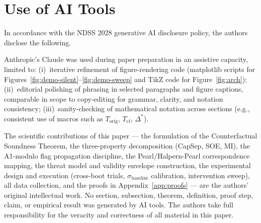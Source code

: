 \documentclass[conference]{IEEEtran}
\newcommand{\Korig}{T_\text{orig}}
\newcommand{\Tcf}{T_\text{cf}}
\newcommand{\sigbase}{\hat{\sigma}_\text{baseline}}
\newcommand{\Dstar}{\Delta^{*}}
\begin{document}
\section{Use of AI Tools}\label{app:ai-disclosure}

In accordance with the NDSS 2028 generative AI disclosure
policy, the authors disclose the following.

Anthropic's Claude was used during paper preparation in an
assistive capacity, limited to: (i)~iterative refinement of
figure-rendering code (matplotlib scripts for
Figures~\ref{fig:demo-silent}--\ref{fig:demo-sweep} and TikZ
code for Figure~\ref{fig:arch}); (ii)~editorial polishing of
phrasing in selected paragraphs and figure captions, comparable
in scope to copy-editing for grammar, clarity, and notation
consistency; (iii)~sanity-checking of mathematical notation
across sections (e.g., consistent use of macros such as
$\Korig$, $\Tcf$, $\Dstar$).

The scientific contributions of this paper --- the formulation
of the Counterfactual Soundness Theorem, the three-property
decomposition (CapSep, SOE, MI), the A1-modulo flag
propagation discipline, the Pearl/Halpern-Pearl correspondence
mapping, the threat model and validity envelope construction,
the experimental design and execution (cross-boot trials,
$\sigbase$ calibration, intervention sweep), all data
collection, and the proofs in Appendix~\ref{app:proofs} ---
are the authors' original intellectual work. No section,
subsection, theorem, definition, proof step, claim, or
empirical result was generated by AI tools. The authors take
full responsibility for the veracity and correctness of all
material in this paper.
\end{document}
